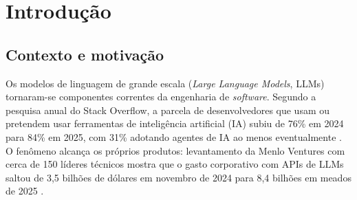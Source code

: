 \chapter{Introdução}
\label{cap:introducao}

\section{Contexto e motivação}
\label{sec:contexto}

Os modelos de linguagem de grande escala (\textit{Large Language Models},
LLMs) tornaram-se componentes correntes da engenharia de
\textit{software}. Segundo a pesquisa anual do Stack Overflow, a parcela de
desenvolvedores que usam ou pretendem usar ferramentas de inteligência
artificial (IA) subiu de 76\% em 2024 para 84\% em 2025, com 31\%
adotando agentes de IA ao menos eventualmente \cite{stackoverflow2025}. O
fenômeno alcança os próprios produtos: levantamento da Menlo Ventures com cerca
de 150 líderes técnicos mostra que o gasto corporativo com APIs de
LLMs saltou de 3,5 bilhões de dólares em novembro de 2024 para 8,4 bilhões em
meados de 2025 \cite{menlo2025}.

